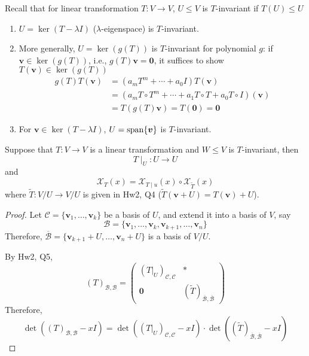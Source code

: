 Recall that for linear transformation $T:V\to V$, $U\le V$ is $T$-invariant if $T(U)\le U$
\begin{example}
\begin{enumerate}
\item
$U=\ker(T-\lambda I)$ ($\lambda$-eigenspace) is $T$-invariant.
\item
More generally, $U=\ker(g(T))$ is $T$-invariant for polynomial $g$:
if $\bm v\in\ker(g(T))$, i.e., $g(T)\bm v=\bm0$, it suffices to show $T(\bm v)\in\ker(g(T))$
\begin{align*}
g(T)T(\bm v) &= (a_mT^m+\cdots+a_0I)T(\bm v)\\
&=
(a_mT\circ T^m+\cdots+a_1T\circ T+a_0T\circ I)(\bm v)\\
&=
T(g(T)\bm v)=T(\bm 0)=\bm0
\end{align*}
\item
For $\bm v\in\ker(T-\lambda I)$, $U=\operatorname{span}\{\bm v\}$ is $T$-invariant.
\end{enumerate}

\end{example}

\begin{proposition}
Suppose that $T:V\to V$ is a linear transformation and $W\le V$ is $T$-invariant, then
\[
T\mid_U:U\to U
\]
and
\[
\mathcal{X}_T(x) = \mathcal{X}_{T\mid u}(x)\circ\mathcal{X}_{\tilde{T}}(x)
\]
where $\tilde{T}:V/U\to V/U$ is given in Hw2, Q4 ($\tilde{T}(\bm v+U) = T(\bm v)+U$).  
\end{proposition}
\begin{proof}
Let $\mathcal{C} = \{\bm v_1,\dots,\bm v_k\}$ be a basis of $U$, and extend it into a basis of $V$, say
\[
\mathcal{B}=\{\bm v_1,\dots,\bm v_k,\bm v_{k+1},\dots,\bm v_n\}
\]
Therefore, $\overline{\mathcal{B}} = \{\bm v_{k+1}+U,\dots,\bm v_n+U\}$ is a basis of $V/U$.

By Hw2, Q5,
\[
(T)_{\mathcal{B},\mathcal{B}} = \begin{pmatrix}
(T|_{U})_{\mathcal{C},\mathcal{C}}&*\\
\bm0&(\tilde{T})_{\overline{\mathcal{B}},\overline{\mathcal{B}}}
\end{pmatrix}
\]
Therefore,
\[
\det((T)_{\mathcal{B},\mathcal{B}} - xI) = \det((T|_{U})_{\mathcal{C},\mathcal{C}} - xI)\cdot\det((\tilde{T})_{\overline{\mathcal{B}},\overline{\mathcal{B}}} - xI)
\]
\end{proof}

